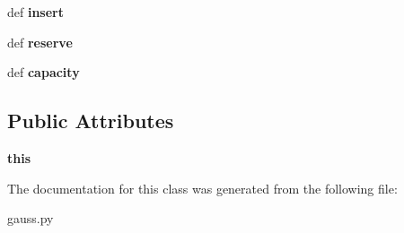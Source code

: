 \begin{DoxyCompactItemize}
\item 
\hypertarget{classgauss_1_1_int_vector_a5edc824ab40da69e17c0651908433779}{def {\bfseries insert}}\label{classgauss_1_1_int_vector_a5edc824ab40da69e17c0651908433779}

\item 
\hypertarget{classgauss_1_1_int_vector_a6221b7e5b667728a4c3ae021a39caf18}{def {\bfseries reserve}}\label{classgauss_1_1_int_vector_a6221b7e5b667728a4c3ae021a39caf18}

\item 
\hypertarget{classgauss_1_1_int_vector_aaaef50179f18da5e24c219dcf3b494f5}{def {\bfseries capacity}}\label{classgauss_1_1_int_vector_aaaef50179f18da5e24c219dcf3b494f5}

\end{DoxyCompactItemize}
\subsection*{Public Attributes}
\begin{DoxyCompactItemize}
\item 
\hypertarget{classgauss_1_1_int_vector_af3279456be1c615f059db3b3772d283f}{{\bfseries this}}\label{classgauss_1_1_int_vector_af3279456be1c615f059db3b3772d283f}

\end{DoxyCompactItemize}


The documentation for this class was generated from the following file\-:\begin{DoxyCompactItemize}
\item 
gauss.\-py\end{DoxyCompactItemize}
